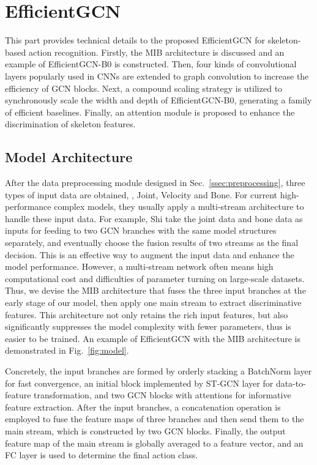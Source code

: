 \documentclass[10pt,journal,compsoc]{IEEEtran}
\begin{document}
\section{EfficientGCN}
\label{sec:efficientgcn}

This part provides technical details to the proposed EfficientGCN for skeleton-based action recognition. Firstly, the MIB architecture is discussed and an example of EfficientGCN-B0 is constructed. Then, four kinds of convolutional layers popularly used in CNNs are extended to graph convolution to increase the efficiency of GCN blocks. Next, a compound scaling strategy is utilized to synchronously scale the width and depth of EfficientGCN-B0, generating a family of efficient baselines. Finally, an attention module is proposed to enhance the discrimination of skeleton features.

\subsection{Model Architecture}
\label{ssec:architecture}

After the data preprocessing module designed in Sec.~\ref{ssec:preprocessing}, three types of input data are obtained, \ie, Joint, Velocity and Bone. For current high-performance complex models, they usually apply a multi-stream architecture to handle these input data. For example, Shi \etal \cite{shi2019two} take the joint data and bone data as inputs for feeding to two GCN branches with the same model structures separately, and eventually choose the fusion results of two streams as the final decision. This is an effective way to augment the input data and enhance the model performance. However, a multi-stream network often means high computational cost and difficulties of parameter turning on large-scale datasets. Thus, we devise the MIB architecture that fuses the three input branches at the early stage of our model, then apply one main stream to extract discriminative features. This architecture not only retains the rich input features, but also significantly suppresses the model complexity with fewer parameters, thus is easier to be trained. An example of EfficientGCN with the MIB architecture is demonstrated in Fig.~\ref{fig:model}.

Concretely, the input branches are formed by orderly stacking a BatchNorm layer for fast convergence, an initial block implemented by ST-GCN layer \cite{yan2018spatial} for data-to-feature transformation, and two GCN blocks with attentions for informative feature extraction. After the input branches, a concatenation operation is employed to fuse the feature maps of three branches and then send them to the main stream, which is constructed by two GCN blocks. Finally, the output feature map of the main stream is globally averaged to a feature vector, and an FC layer is used to determine the final action class.
\end{document}
